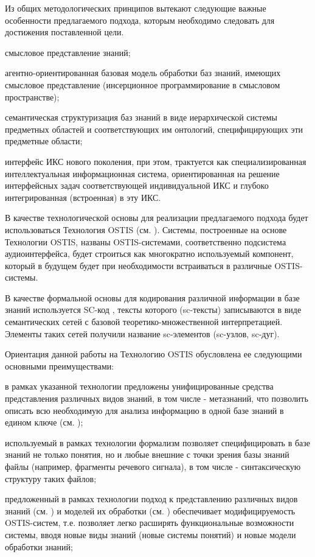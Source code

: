 Из общих методологических принципов вытекают следующие важные особенности предлагаемого подхода, которым необходимо следовать для достижения поставленной цели.
\begin{textitemize}    
    \item смысловое представление знаний;
    \item агентно-ориентированная базовая модель обработки баз знаний, имеющих смысловое представление (инсерционное программирование в смысловом пространстве);
    \item семантическая структуризация баз знаний в виде иерархической системы предметных областей и соответствующих им онтологий, специфицирующих эти предметные области;
    \item интерфейс ИКС нового поколения, при этом, трактуется как специализированная интеллектуальная информационная система, ориентированная на решение интерфейсных задач соответствующей индивидуальной ИКС и глубоко интегрированная (встроенная) в эту ИКС.
\end{textitemize}

 В качестве технологической основы для реализации предлагаемого подхода будет использоваться Технология OSTIS (см. ). Системы, построенные на основе Технологии OSTIS, названы OSTIS-системами, соответственно подсистема аудиоинтерфейса, будет строиться как многократно используемый компонент, который в будущем будет при необходимости встраиваться в различные OSTIS-системы.

В качестве формальной основы для кодирования различной информации в базе знаний используется SC-код , тексты которого (sc-тексты) записываются в виде семантических сетей с базовой теоретико-множественной интерпретацией. Элементы таких сетей получили название sc-элементов (sc-узлов, sc-дуг).

Ориентация данной работы на Технологию OSTIS обусловлена ее следующими основными преимуществами:
\begin{textitemize}
\item в рамках указанной технологии предложены унифицированные средства представления различных видов знаний, в том числе - метазнаний, что позволить описать всю необходимую для анализа информацию в одной базе знаний в едином ключе (см. );
\item используемый в рамках технологии формализм позволяет специфицировать в базе знаний не только понятия, но и любые внешние с точки зрения базы знаний файлы (например, фрагменты речевого сигнала), в том числе - синтаксическую структуру таких файлов;
\item предложенный в рамках технологии подход к представлению различных видов знаний (см. ) и моделей их обработки (см. ) обеспечивает модифицируемость OSTIS-систем, т.е. позволяет легко расширять функциональные возможности системы, вводя новые виды знаний (новые системы понятий) и новые модели обработки знаний;
\end{textitemize}

